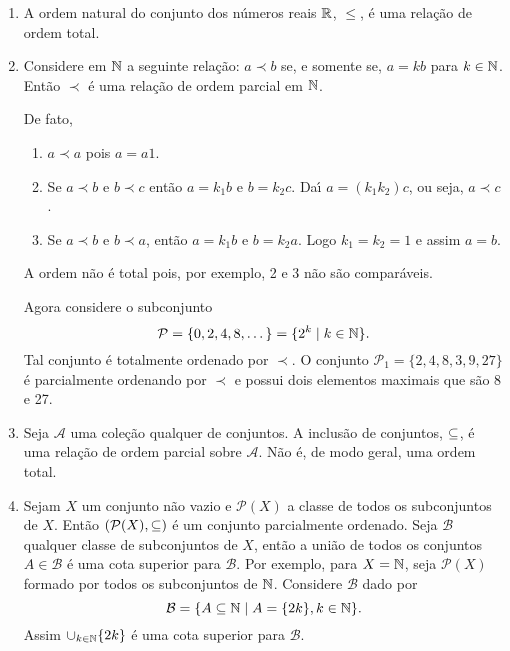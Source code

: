 \begin{exemplo}
	\begin{enumerate}[label={\arabic*})]
		\item A ordem natural do conjunto dos n\'umeros reais $\mathbb{R}$, $\le$, \'e uma rela\c{c}\~ao de ordem total.
		\item Considere em $\mathbb{N}$ a seguinte rela\c{c}\~ao: $a \prec b$ se, e somente se, $a = kb$ para $k \in \mathbb{N}$. Ent\~ao $\prec$ \'e uma rela\c{c}\~ao de ordem parcial em $\mathbb{N}$.
		\begin{solucao}
			De fato,
			\begin{enumerate}
				\item $a \prec a$ pois $a = a1$.
				\item Se $a \prec b$ e $b \prec c$ ent\~ao $a = k_1b$ e $b = k_2 c$. Da{\'\i} $a = (k_1k_2)c$, ou seja, $a \prec c$.
				\item Se $a \prec b$ e $b \prec a$, ent\~ao $a = k_1b$ e $b = k_2a$. Logo $k_1 = k_2 = 1$ e assim $a = b$.
			\end{enumerate}
			A ordem n\~ao \'e total pois, por exemplo, 2 e 3 n\~ao s\~ao compar\'aveis.

			Agora considere o subconjunto
			\[
				\mathcal{P} = \{0,2,4,8,\dots\} = \{2^k \mid k \in \mathbb{N}\}.
			\]
			Tal conjunto \'e totalmente ordenado por $\prec$. O conjunto $\mathcal{P}_1 = \{2,4,8,3,9,27\}$ \'e parcialmente ordenando por $\prec$ e possui dois elementos maximais que s\~ao 8 e 27.
		\end{solucao}
		\item Seja $\mathcal{A}$ uma cole\c{c}\~ao qualquer de conjuntos. A inclus\~ao de conjuntos, $\subseteq$, \'e uma rela\c{c}\~ao de ordem parcial sobre $\mathcal{A}$. N\~ao \'e, de modo geral, uma ordem total.
		\item Sejam $X$ um conjunto n\~ao vazio e $\mathcal{P}(X)$ a classe de todos os subconjuntos de $X$. Ent\~ao $(\mathcal{P}(X),\subseteq)$ \'e um conjunto parcialmente ordenado. Seja $\mathcal{B}$ qualquer classe de subconjuntos de $X$, ent\~ao a uni\~ao de todos os conjuntos $A \in \mathcal{B}$ \'e uma cota superior para $\mathcal{B}$. Por exemplo, para $X = \mathbb{N}$, seja $\mathcal{P}(X)$ formado por todos os subconjuntos de $\mathbb{N}$. Considere $\mathcal{B}$ dado por
		\[
			\mathcal{B} = \{A\subseteq \mathbb{N} \mid A = \{2k\}, k \in \mathbb{N}\}.
		\]
		Assim $\cup_{k \in \mathbb{N}}\{2k\}$ \'e uma cota superior para $\mathcal{B}$.
	\end{enumerate}
\end{exemplo}

